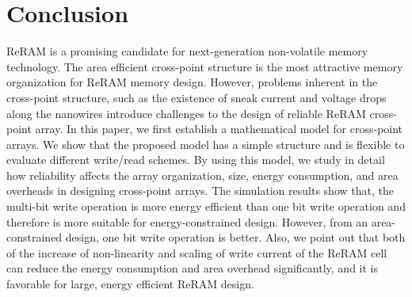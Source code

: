 \section{Conclusion}\label{sec:conclusion}

ReRAM is a promising candidate for next-generation non-volatile memory
technology. The area efficient cross-point structure is the most
attractive memory organization for ReRAM memory design. However, problems
inherent in the cross-point structure, such as the existence of sneak
current and voltage drops along the nanowires introduce challenges to the
design of reliable ReRAM cross-point array. In this paper, we first
establish a mathematical model for cross-point arrays. We show that the
proposed model has a simple structure and is flexible to evaluate
different write/read schemes. By using this model, we study in detail how
reliability affects the array organization, size, energy consumption, and
area overheads in designing cross-point arrays. The simulation results
show that, the multi-bit write operation is more energy efficient than one
bit write operation and therefore is more suitable for energy-constrained
design. However, from an area-constrained design, one bit write operation
is better. Also, we point out that both of the increase of non-linearity
and scaling of write current of the ReRAM cell can reduce the energy
consumption and area overhead significantly, and it is favorable for
large, energy efficient ReRAM design.
